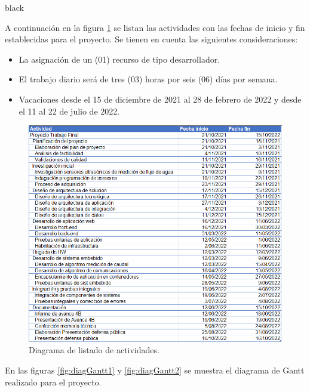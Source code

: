 \documentclass[
11pt, %
codirector, %
]{charter}
\begin{document}
\begin{consigna}{black}

A continuación en la figura \ref{fig:ListaGantt} se listan las actividades con las fechas de inicio y fin establecidas para el proyecto. Se tienen en cuenta las siguientes consideraciones:

\begin{itemize}
		\item La asignación de un (01) recurso de tipo desarrollador.
		\item El trabajo diario será de tres (03) horas por seis (06) días por semana.
		\item Vacaciones desde el 15 de diciembre de 2021 al 28 de febrero de 2022 y desde el 11 al 22 de julio de 2022.
\end{itemize}

\begin{figure}[htpb]
\centering 
\includegraphics[scale=.7]{./Figuras/TF-gantt-lista.png} 
\caption{Diagrama de listado de actividades.}
\label{fig:ListaGantt}
\end{figure}


En las figuras \ref{fig:diagGantt1} y \ref{fig:diagGantt2} se muestra el diagrama de Gantt realizado para el proyecto.


\end{consigna}
\end{document}
